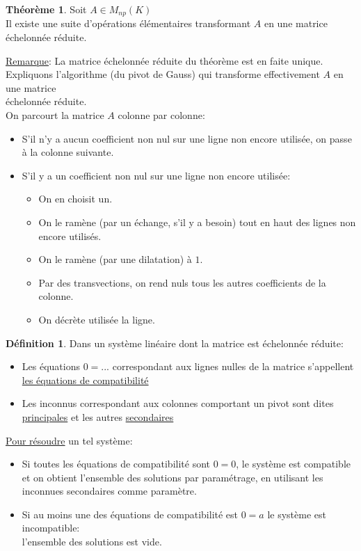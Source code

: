 \documentclass[10pt,a4paper]{article}
\theoremstyle{definition}
\newtheorem{theorem}[proposition]{Théorème}
\newtheorem{definition}[proposition]{Définition}
\begin{document}
\pagebreak

\begin{theorem}
Soit $A \in M_{np}(K)$ \\
Il existe une suite d'opérations élémentaires transformant $A$ en une matrice échelonnée réduite.
\end{theorem}
\noindent \uline{Remarque}: La matrice échelonnée réduite du théorème est en faite unique. \\
Expliquons l'algorithme (du pivot de Gauss) qui transforme effectivement $A$ en une matrice \\
échelonnée réduite. \\
On parcourt la matrice $A$ colonne par colonne:
\begin{itemize}
\item S'il n'y a aucun coefficient non nul sur une ligne non encore utilisée, on passe à la colonne suivante.
\item S'il y a un coefficient non nul sur une ligne non encore utilisée:
\begin{itemize}
\item On en choisit un.
\item On le ramène (par un échange, s'il y a besoin) tout en haut des lignes non encore utilisés.
\item On le ramène (par une dilatation) à $1$.
\item Par des transvections, on rend nuls tous les autres coefficients de la colonne.
\item On décrète utilisée la ligne.
\end{itemize}
\end{itemize}
\begin{definition}
Dans un système linéaire dont la matrice est échelonnée réduite:
\begin{itemize}
\item Les équations $0 = ...$ correspondant aux lignes nulles de la matrice s'appellent \\
\uline{les équations de compatibilité}
\item Les inconnus correspondant aux colonnes comportant un pivot sont dites \\
\uline{principales} et les autres \uline{secondaires}
\end{itemize}
\uline{Pour résoudre} un tel système:
\begin{itemize}
\item Si toutes les équations de compatibilité sont $0 = 0$, le système est compatible et on obtient l'ensemble des solutions par paramétrage, en utilisant les inconnues secondaires comme paramètre.
\item Si au moins une des équations de compatibilité est $0 = a$ le système est incompatible: \\ l'ensemble des solutions est vide.
\end{itemize}
\end{definition}
\end{document}
